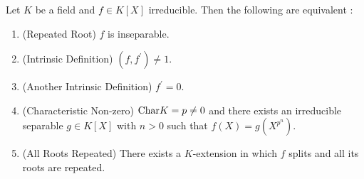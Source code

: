 \documentclass[main.tex]{subfiles}
\begin{document}
\begin{thm} 
  
  Let $K$ be a field and $f \in K[X]$ irreducible. 
  Then the following are equivalent : 
  \begin{enumerate}
    \item (Repeated Root) $f$ is inseparable. 
    \item (Intrinsic Definition) $(f,f^\prime) \neq 1$.
    \item (Another Intrinsic Definition) $f^\prime = 0$.
    \item (Characteristic Non-zero) 
    $\mathrm{Char}K = p \neq 0$ and 
    there exists an irreducible separable $g \in K[X]$ with $n > 0$ such that 
    $f(X) = g(X^{p^n})$. 
    \item (All Roots Repeated) There exists a $K$-extension in which 
    $f$ splits and all its roots are repeated. 
  \end{enumerate}
\end{thm}
\end{document}
